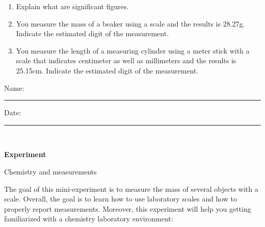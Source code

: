 \documentclass[main.tex]{subfiles}
\begin{document}
\begin{enumerate}
\begin{tabular}{ p{3cm} p{3cm} p{3cm}p{3cm}   }
 \end{tabular}
\vspace{.5cm}

\item Explain what are significant figures.
\vspace{2cm}


\item You measure the mass of a beaker using a scale and the results is 28.27g. Indicate the estimated digit of the measurement.
\vspace{1cm}


\item You measure the length of a measuring cylinder using a meter stick with a scale that indicates centimeter as well as millimeters and the results is 25.15cm. Indicate the estimated digit of the measurement.
\vspace{3cm}



\end{enumerate}


\clearpage\mbox{}\clearpage



\begin{multicols}{2}
\begin{tcolorbox}[enhanced jigsaw,breakable,size=title,
colback=mybrown!05,colframe=black,fonttitle=\bfseries,
title=STUDENT INFO,pad at break=1mm, break at=15cm/0pt ]
\vspace{0.2cm}
\noindent Name: \rule{5cm}{0.4pt}Date:\rule{1cm}{0.4pt}\\
\end{tcolorbox}
\end{multicols}
\hfill
\vspace{0.2cm}
\begin{center}
{\large \bfseries 
Experiment
\par
\Huge
Chemistry and measurements
\\[5pt] \par}
\vspace{0.2cm}
\end{center}
\par
\noindent
\uline{  \hfill \normalsize \hfill       }

\vspace{0.2cm}{\large \bfseries 1. Measuring mass}
The goal of this mini-experiment is to measure the mass of several objects with a scale. Overall, the goal is to learn how to use laboratory scales and how to properly report measurements. Moreover, this experiment will help you getting familiarized with a chemistry laboratory environment:
\end{document}
